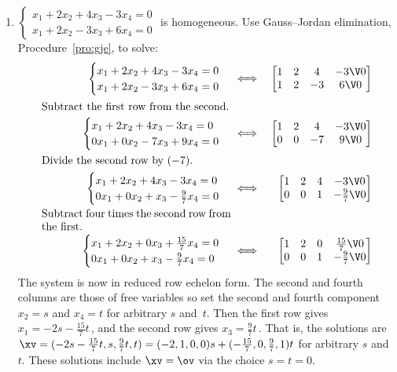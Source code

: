 \begin{example}
\begin{enumerate}
\item \label{eg:homosysiv} 
\(\begin{cases}
x_1+2x_2+4x_3-3x_4=0\\
x_1+2x_2-3x_3+6x_4=0
\end{cases}\) is homogeneous.  
Use Gauss--Jordan elimination, Procedure~\ref{pro:gje}, to solve: 
\begin{eqnarray*}
\begin{cases}
x_1+2x_2+4x_3-3x_4=0\\
x_1+2x_2-3x_3+6x_4=0
\end{cases}
&\iff&%
\begin{bmatrix} 1&2&4&-3\V0
\\1&2&-3&6\V0
 \end{bmatrix}
\\
\parbox{0.5\linewidth}{Subtract the first row from the second.}
\\
\begin{cases}
x_1+2x_2+4x_3-3x_4=0\\
0x_1+0x_2-7x_3+9x_4=0
\end{cases}
&\iff&%
\begin{bmatrix} 1&2&4&-3\V0
\\0&0&-7&9\V0
 \end{bmatrix}
\\
\parbox{0.5\linewidth}{Divide the second row by~\((-7)\).}
\\
\begin{cases}
x_1+2x_2+4x_3-3x_4=0\\
0x_1+0x_2+x_3-\frac97x_4=0
\end{cases}
&\iff&%
\begin{bmatrix} 1&2&4&-3\V0
\\0&0&1&-\frac97\V0
 \end{bmatrix}
\\
\parbox{0.5\linewidth}{Subtract four times the second row from the first.}
\\
\begin{cases}
x_1+2x_2+0x_3+\frac{15}7x_4=0\\
0x_1+0x_2+x_3-\frac97x_4=0
\end{cases}
&\iff&%
\begin{bmatrix} 1&2&0&\frac{15}7\V0
\\0&0&1&-\frac97\V0
 \end{bmatrix}
\end{eqnarray*}
The system is now in reduced row echelon form.  
The second and fourth columns are those of free variables so set the second and fourth component \(x_2=s\) and \(x_4=t\) for arbitrary \(s\) and~\(t\).
Then the first row gives \(x_1=-2s-\frac{15}7t\)\,, and the second row gives \(x_3=\frac97t\)\,.
That is, the solutions are \(\xv=(-2s-\frac{15}7t,s,\frac97t,t) =(-2,1,0,0)s+(-\frac{15}7,0,\frac97,1)t\) for arbitrary \(s\) and~\(t\).
These solutions include \(\xv=\ov\) via the choice \(s=t=0\).
\end{enumerate}
\end{example}




